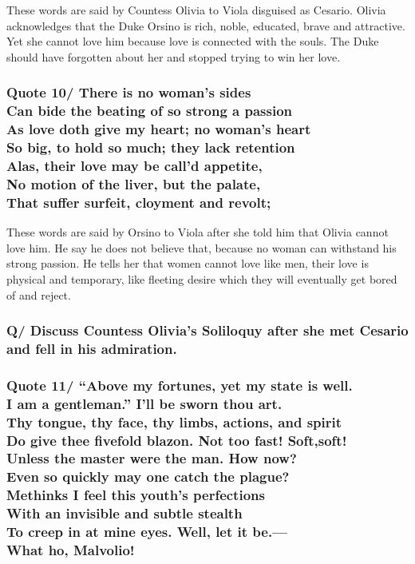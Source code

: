 \documentclass[12pt, a4paper]{article}
\begin{document}
These words are said by Countess Olivia to Viola disguised as Cesario.
Olivia acknowledges that the Duke Orsino is rich, noble, educated, brave 
and attractive. Yet she cannot love him because love is connected with
the souls. The Duke should have forgotten about her and stopped trying 
to win her love.

\subsubsection*{Quote 10/
There is no woman's sides\\
Can bide the beating of so strong a passion\\
As love doth give my heart; no woman's heart\\
So big, to hold so much; they lack retention\\
Alas, their love may be call'd appetite,\\
No motion of the liver, but the palate,\\
That suffer surfeit, cloyment and revolt;
}

These words are said by Orsino to Viola after she told him that
Olivia cannot love him. He say he does not believe that, because 
no woman can withstand his strong passion. He tells her that women 
cannot love like men, their love is physical and temporary, like
fleeting desire which they will eventually get bored of and reject.

\subsubsection*{Q/ Discuss Countess Olivia's Soliloquy after she met
Cesario and fell in his admiration.}

\subsubsection*{Quote 11/
“Above my fortunes, yet my state is well.\\
I am a gentleman.” I’ll be sworn thou art.\\
Thy tongue, thy face, thy limbs, actions, and spirit\\
Do give thee fivefold blazon. Not too fast! Soft,soft!\\
Unless the master were the man. How now?\\
Even so quickly may one catch the plague?\\
Methinks I feel this youth’s perfections\\
With an invisible and subtle stealth\\
To creep in at mine eyes. Well, let it be.—\\
What ho, Malvolio!
}
\end{document}
